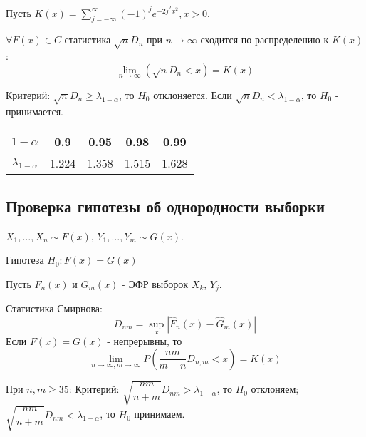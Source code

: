 \begin{theorem}
  Пусть $K(x) = \sum_{j=-\infty}^{\infty} (-1)^j e^{-2j^2 x^2}, x>0$.

  $\forall F(x) \in C$ статистика $\sqrt{n} D_n$ при $n\to\infty$ сходится по распределению к $K(x)$:
  \[
    \lim_{n\to\infty} (\sqrt{n} D_n < x) = K(x)
  \]


  Критерий: $\sqrt{n} D_n \geqslant \lambda_{1-\alpha}$, то $H_0$ отклоняется. Если $\sqrt{n} D_n < \lambda_{1-\alpha}$, то $H_0$ - принимается.

  \begin{center}
    \begin{tabular}{|c|c|c|c|c|}
      \hline
      $1-\alpha$ & 0.9 & 0.95 & 0.98 & 0.99 \\
      \hline
      $\lambda_{1-\alpha}$ & 1.224 & 1.358 & 1.515 & 1.628 \\
      \hline
    \end{tabular}
  \end{center}
\end{theorem}

\subsection{Проверка гипотезы об однородности выборки}

$X_1, \dots, X_n \sim F(x)$, $Y_1, \dots, Y_m \sim G(x)$.

Гипотеза $H_0: F(x) = G(x)$

\begin{theorem}[Смирнов]
  Пусть $\hat{F}_n(x) $ и $\hat{G}_m(x)$ - ЭФР выборок $X_k$, $Y_j$.
  
  Статистика Смирнова:
  \[
    D_{nm} = \sup_x |\hat{F}_n(x) - \hat{G}_m(x)|
  \]
  Если $F(x) = G(x)$ - непрерывны, то
  \[
    \lim_{n\to\infty, m\to\infty} P\left(\dfrac{nm}{m+n} D_{n,m} < x\right) = K(x)
  \]

  При $n, m \geqslant 35$:
  Критерий: $\sqrt{\dfrac{nm}{n+m}} D_{nm} > \lambda_{1-\alpha}$, то $H_0$ отклоняем; $\sqrt{\dfrac{nm}{n+m}} D_{nm} < \lambda_{1-\alpha}$, то $H_0$ принимаем.
\end{theorem}

